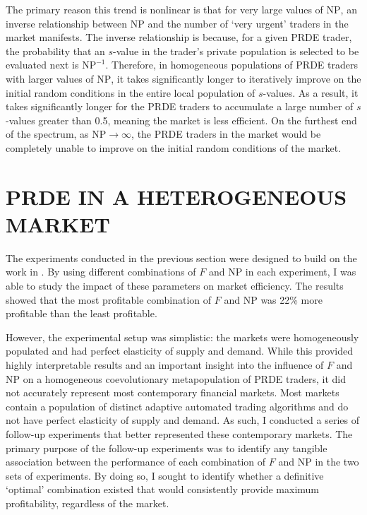 \documentclass[a4paper,twoside]{article}
\begin{document}
The primary reason this trend is nonlinear is that for very large values of $\mathrm{NP}$, an inverse relationship between $\mathrm{NP}$ and the number of `very urgent' traders in the market manifests.
The inverse relationship is because, for a given PRDE trader, the probability that an $s$-value in the trader's private population is selected to be evaluated next is $\mathrm{NP}^{-1}$.
Therefore, in homogeneous populations of PRDE traders with larger values of $\mathrm{NP}$, it takes significantly longer to iteratively improve on the initial random conditions in the entire local population of $s$-values.
As a result, it takes significantly longer for the PRDE traders to accumulate a large number of $s$-values greater than 0.5, meaning the market is less efficient.
On the furthest end of the spectrum, as $\mathrm{NP}\to\infty$, the PRDE traders in the market would be completely unable to improve on the initial random conditions of the market.

\section{\uppercase{PRDE in a Heterogeneous Market}}

The experiments conducted in the previous section were designed to build on the work in \cite{PRDE}.
By using different combinations of $F$ and $\mathrm{NP}$ in each experiment, I was able to study the impact of these parameters on market efficiency.
The results showed that the most profitable combination of $F$ and $\mathrm{NP}$ was 22\% more profitable than the least profitable.

However, the experimental setup was simplistic: the markets were homogeneously populated and had perfect elasticity of supply and demand.
While this provided highly interpretable results and an important insight into the influence of $F$ and $\mathrm{NP}$ on a homogeneous coevolutionary metapopulation of PRDE traders, it did not accurately represent most contemporary financial markets.
Most markets contain a population of distinct adaptive automated trading algorithms and do not have perfect elasticity of supply and demand.
As such, I conducted a series of follow-up experiments that better represented these contemporary markets. 
The primary purpose of the follow-up experiments was to identify any tangible association between the performance of each combination of $F$ and $\mathrm{NP}$ in the two sets of experiments.
By doing so, I sought to identify whether a definitive `optimal' combination existed that would consistently provide maximum profitability, regardless of the market.
\end{document}
